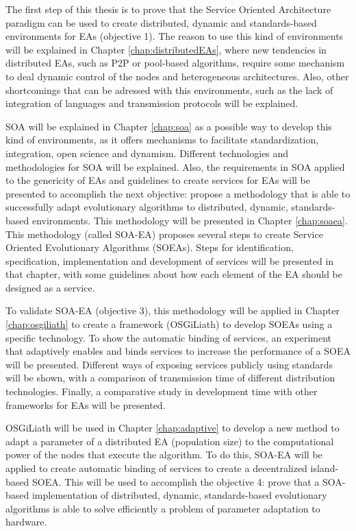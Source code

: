 The first step of this thesis is to prove that the Service Oriented Architecture paradigm can be used to create distributed, dynamic and standards-based environments for EAs (objective 1). The reason to use this kind of environments will be explained in Chapter \ref{chap:distributedEAs}, where new tendencies in distributed EAs, such as P2P or pool-based algorithms, require some mechanism to deal dynamic control of the nodes and heterogeneous architectures. Also, other shortcomings that can be adressed with this environments, such as the lack of integration of languages and transmission protocols will be explained.

 SOA will be explained in Chapter \ref{chap:soa} as a possible way to develop this kind of environments, as it offers mechanisms to facilitate standardization, integration, open science and dynamism. Different technologies and methodologies for SOA will be explained. Also, the requirements in SOA applied to the genericity of EAs and guidelines to create services for EAs will be presented to accomplish the next objective: propose a methodology that is able to successfully adapt evolutionary algorithms to distributed, dynamic, standards-based environments. This methodology will be presented in Chapter \ref{chap:soaea}. This methodology (called SOA-EA) proposes several steps to create Service Oriented Evolutionary Algorithms (SOEAs). Steps for identification, specification, implementation and development of services will be presented in that chapter, with some guidelines about how each element of the EA should be designed as a service.

To validate SOA-EA (objective 3), this methodology will be applied in Chapter \ref{chap:osgiliath} to create a framework (OSGiLiath) to develop SOEAs using a
specific technology. %
To show the automatic binding of services, an experiment that
adaptively enables and binds services to increase the performance of a SOEA %
will be presented. Different ways of exposing services publicly using standards will be shown, with a comparison of transmission time of different distribution technologies. Finally, a comparative study in development time with other frameworks for EAs will be presented.

OSGiLiath will be used in Chapter \ref{chap:adaptive} to develop a new method to adapt a parameter of a distributed EA (population size) to the computational power of the nodes that execute the algorithm. To do this, SOA-EA will be applied to create automatic binding of services to create a decentralized island-based SOEA. This will be used to accomplish the objective 4: prove that a SOA-based implementation of distributed, dynamic, standards-based evolutionary algorithms is able to solve efficiently a problem of parameter adaptation to hardware.

